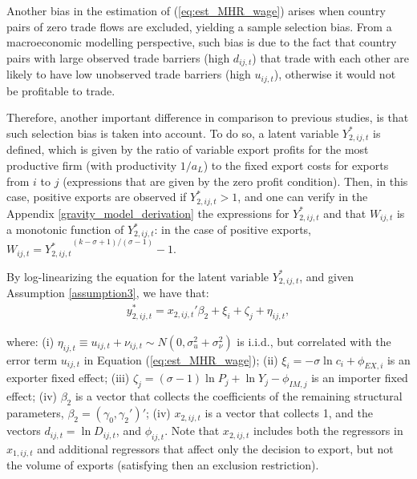Another bias in the estimation of (\ref{eq:est_MHR_wage}) arises when country pairs of zero trade flows are excluded, yielding a sample selection bias. From a macroeconomic modelling perspective, such bias is due to the fact that country pairs with large observed trade barriers (high $d_{ij,t}$) that trade with each other are likely to have low unobserved trade barriers (high $u_{ij,t}$), otherwise it would not be profitable to trade. 

Therefore, another important difference in comparison to previous studies, is that such selection bias is taken into account. To do so, a latent variable $Y_{2,ij,t}^*$ is defined, which is given by the ratio of variable export profits for the most productive firm (with productivity $1/a_L$) to the fixed export costs for exports from $i$ to $j$ (expressions that are given by the zero profit condition). Then, in this case, positive exports are observed if $Y_{2,ij,t}^* > 1$, and one can verify in the Appendix \ref{gravity_model_derivation} the expressions for $Y_{2,ij,t}^*$ and that $W_{ij,t}$ is a monotonic function of $Y_{2,ij,t}^*$: in the case of positive exports, $W_{ij,t} = {Y_{2,ij,t}^*}^{(k-\sigma +1)/(\sigma-1)} - 1$.

By log-linearizing the equation for the latent variable $Y_{2,ij,t}^*$, and given Assumption \ref{assumption3}, we have that:
\begin{align}
    y_{2,i j,t}^*= x_{2,ij,t}'\beta_2 +\xi_{i}+\zeta_{j} +\eta_{i j,t},
    \label{eq:est_MHR_sampleselection}
\end{align}

\noindent where: (i) $\eta_{ij,t} \equiv u_{ij,t} + \nu_{ij,t} \sim N(0, \sigma_u^2 + \sigma_\nu^2)$ is i.i.d., but correlated with the error term $u_{ij,t}$ in Equation (\ref{eq:est_MHR_wage}); (ii) $\xi_{i}=-\sigma \ln c_{i}+\phi_{E X, i}$ is an exporter fixed effect; (iii) $\zeta_{j}=(\sigma-1) \ln P_{j}+ \ln Y_{j}-\phi_{I M, j}$ is an importer fixed effect; (iv) $\beta_2$ is a vector that collects the coefficients of the remaining structural parameters, $\beta_2 = (\gamma_0, \gamma_2')'$; (iv) $x_{2,ij,t}$ is a vector that collects 1, and the vectors $ d_{ij,t} = \ln D_{ij,t}$, and $\phi_{ij,t}$. Note that $x_{2,ij,t}$ includes both the regressors in $x_{1,ij,t}$ and additional regressors that affect only the decision to export, but not the volume of exports (satisfying then an exclusion restriction). 

